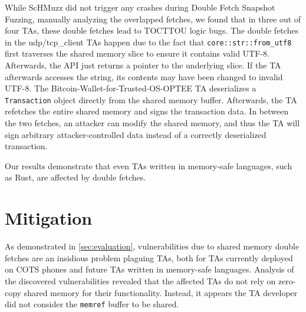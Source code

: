 \documentclass[conference]{IEEEtran}
\newcommand{\sysname}{ScHMuzz\xspace}
\newcommand{\stagetwo}{Double Fetch Snapshot Fuzzing\xspace}
\begin{document}
While \sysname did not trigger any crashes during \stagetwo, manually analyzing the 
overlapped fetches, we found that in three out of four TAs, these double fetches lead to TOCTTOU logic bugs.
The double fetches in the udp/tcp\_client TAs happen due to the fact that \texttt{core::str::from\_utf8} 
first traverses the shared memory slice to ensure it contains valid UTF-8. Afterwards, the API just 
returns a pointer to the underlying slice. If the TA afterwards accesses the string, 
its contents may have been changed to invalid UTF-8. 
The Bitcoin-Wallet-for-Trusted-OS-OPTEE TA deserializes a \texttt{Transaction} object directly from the 
shared memory buffer. Afterwards, the TA refetches the entire shared memory and signs the transaction 
data. In between the two fetches, an attacker can modify the shared memory, and thus the TA will 
sign arbitrary attacker-controlled data instead of a correctly deserialized transaction.
 
Our results demonstrate that even TAs written in memory-safe languages, such as Rust, are affected by double fetches. 


%
%


\section{Mitigation}\label{sec:mitigation}

As demonstrated in \autoref{sec:evaluation}, vulnerabilities due to shared memory 
double fetches are an insidious problem plaguing TAs, both for TAs currently 
deployed on COTS phones and future TAs written in memory-safe languages.
Analysis of the discovered 
vulnerabilities revealed that the affected TAs do not rely on zero-copy shared 
memory for their functionality. Instead, it appears the TA developer did not 
consider the \texttt{memref} buffer to be shared.
\end{document}
